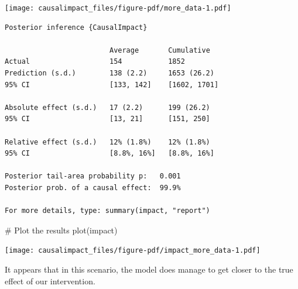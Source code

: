 \documentclass[
  letterpaper,
  DIV=11,
  numbers=noendperiod]{scrreprt}
\newenvironment{Shaded}{\begin{snugshade}}{\end{snugshade}}
\newcommand{\CommentTok}[1]{\textcolor[rgb]{0.37,0.37,0.37}{#1}}
\newcommand{\FunctionTok}[1]{\textcolor[rgb]{0.28,0.35,0.67}{#1}}
\newcommand{\NormalTok}[1]{\textcolor[rgb]{0.00,0.23,0.31}{#1}}
\newcommand{\OtherTok}[1]{\textcolor[rgb]{0.00,0.23,0.31}{#1}}
\newcommand{\SpecialCharTok}[1]{\textcolor[rgb]{0.37,0.37,0.37}{#1}}
\begin{document}
\texttt{[image: causalimpact\_files/figure-pdf/more\_data-1.pdf]}

\begin{Shaded}
\end{Shaded}

\begin{verbatim}
Posterior inference {CausalImpact}

                         Average       Cumulative  
Actual                   154           1852        
Prediction (s.d.)        138 (2.2)     1653 (26.2) 
95% CI                   [133, 142]    [1602, 1701]
                                                   
Absolute effect (s.d.)   17 (2.2)      199 (26.2)  
95% CI                   [13, 21]      [151, 250]  
                                                   
Relative effect (s.d.)   12% (1.8%)    12% (1.8%)  
95% CI                   [8.8%, 16%]   [8.8%, 16%] 

Posterior tail-area probability p:   0.001
Posterior prob. of a causal effect:  99.9%

For more details, type: summary(impact, "report")
\end{verbatim}

\begin{Shaded}
\begin{Highlighting}[]
\CommentTok{\# Plot the results}
\FunctionTok{plot}\NormalTok{(impact)}
\end{Highlighting}
\end{Shaded}

\texttt{[image: causalimpact\_files/figure-pdf/impact\_more\_data-1.pdf]}

It appears that in this scenario, the model does manage to get closer to
the true effect of our intervention.
\end{document}
